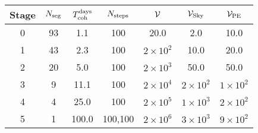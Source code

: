 \begin{tabular}{c|cccccc}
Stage & $N_{\rm seg}$ & $T_{\rm coh}^{\rm days}$ &$N_{\rm steps}$ & $\mathcal{V}$ & $\mathcal{V}_{\rm Sky}$ & $\mathcal{V}_{\rm PE}$ \\ \hline
0 & 93 & 1.1 & 100 & 20.0 & 2.0 & 10.0 \\
1 & 43 & 2.3 & 100 & $2{\times}10^{2}$ & 10.0 & 20.0 \\
2 & 20 & 5.0 & 100 & $2{\times}10^{3}$ & 50.0 & 50.0 \\
3 & 9 & 11.1 & 100 & $2{\times}10^{4}$ & $2{\times}10^{2}$ & $1{\times}10^{2}$ \\
4 & 4 & 25.0 & 100 & $2{\times}10^{5}$ & $1{\times}10^{3}$ & $2{\times}10^{2}$ \\
5 & 1 & 100.0 & 100,100 & $2{\times}10^{6}$ & $3{\times}10^{3}$ & $9{\times}10^{2}$ \\
\end{tabular}
